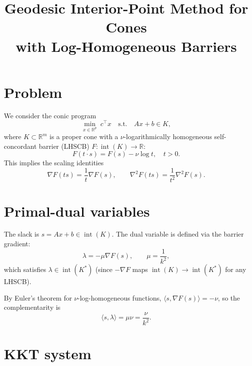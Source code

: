 \documentclass[11pt]{article}
\title{Geodesic Interior-Point Method for Cones\\with Log-Homogeneous Barriers}
\author{}
\date{}
\newcommand{\R}{\mathbb{R}}
\newcommand{\ip}[2]{\langle #1, #2 \rangle}
\begin{document}
\maketitle

\section{Problem}

We consider the conic program
\begin{equation}\label{eq:problem}
  \min_{x \in \R^p} \; c^\top x \quad \text{s.t.} \quad Ax + b \in K,
\end{equation}
where $K \subset \R^m$ is a proper cone with a $\nu$-logarithmically homogeneous
self-concordant barrier (LHSCB) $F : \operatorname{int}(K) \to \R$:
\[
  F(t \cdot s) = F(s) - \nu \log t, \quad t > 0.
\]
This implies the scaling identities
\begin{equation}\label{eq:log-homog}
  \nabla F(ts) = \frac{1}{t} \nabla F(s), \qquad
  \nabla^2 F(ts) = \frac{1}{t^2} \nabla^2 F(s).
\end{equation}

\section{Primal-dual variables}

The slack is $s = Ax + b \in \operatorname{int}(K)$.
The dual variable is defined via the barrier gradient:
\[
  \lambda = -\mu \nabla F(s), \qquad \mu = \frac{1}{k^2},
\]
which satisfies $\lambda \in \operatorname{int}(K^*)$ (since $-\nabla F$ maps
$\operatorname{int}(K) \to \operatorname{int}(K^*)$ for any LHSCB).

By Euler's theorem for $\nu$-log-homogeneous functions,
$\ip{s}{\nabla F(s)} = -\nu$, so the complementarity is
\[
  \ip{s}{\lambda} = \mu \nu = \frac{\nu}{k^2}.
\]

\section{KKT system}
\end{document}
